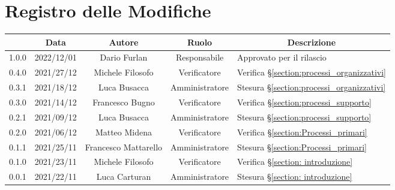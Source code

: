 \thispagestyle{empty}
\section*{Registro delle Modifiche}

\begin{center}
	\renewcommand{\arraystretch}{1.8}
	\begin{longtable}[c]{c | c | c | c | p{5cm}}
		\rowcolor[HTML]{125E28}
		\multicolumn{1}{c}{\color[HTML]{FFFFFF} \textbf{Versione}} & 
		\multicolumn{1}{c}{\color[HTML]{FFFFFF} \textbf{Data}} & 
		\multicolumn{1}{c}{\color[HTML]{FFFFFF} \textbf{Autore}} & 
		\multicolumn{1}{c}{\color[HTML]{FFFFFF} \textbf{Ruolo}} & 
		\multicolumn{1}{c}{\color[HTML]{FFFFFF} \textbf{Descrizione}} \\
		\endhead
		1.0.0 & 2022/12/01 & Dario Furlan & Responsabile & Approvato per il rilascio\\
		0.4.0 & 2021/27/12 & Michele Filosofo & Verificatore & Verifica §\ref{section:processi_organizzativi}\\
		0.3.1 & 2021/18/12 & Luca Busacca & Amministratore & Stesura §\ref{section:processi_organizzativi} \\
		0.3.0 & 2021/14/12 & Francesco Bugno & Verificatore & Verifica §\ref{section:processi_supporto}\\
		0.2.1 & 2021/09/12 & Luca Busacca & Amministratore & Stesura §\ref{section:processi_supporto} \\
		0.2.0 & 2021/06/12 & Matteo Midena & Verificatore & Verifica §\ref{section:Processi_primari} \\
		0.1.1 & 2021/25/11 & Francesco Mattarello & Amministratore & Stesura §\ref{section:Processi_primari} \\
		0.1.0 & 2021/23/11 & Michele Filosofo & Verificatore & Verifica §\ref{section: introduzione} \\
		0.0.1 & 2021/22/11 & Luca Carturan & Amministratore & Stesura §\ref{section: introduzione}\\
		
	\end{longtable}
\end{center}
